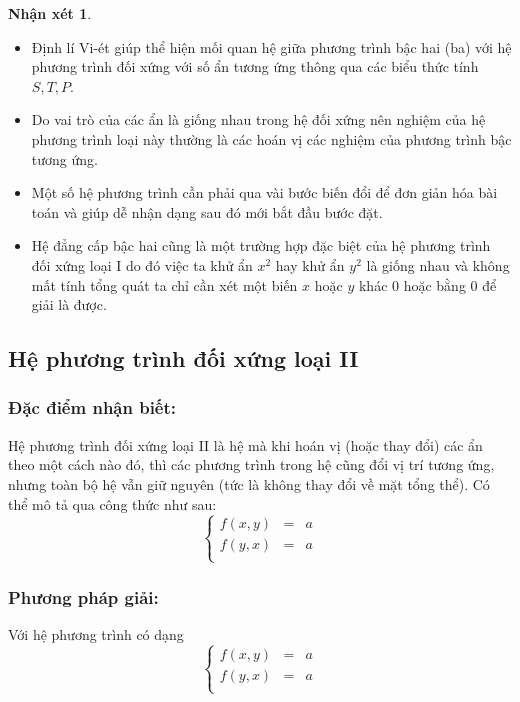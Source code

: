 \documentclass[12pt,a4paper,oneside]{book}
\theoremstyle{theorem}
\theoremstyle{definition}
\newtheorem{nx}[theorem2]{Nhận xét}
\begin{document}
\begin{nx}\begin{itemize}
      \item Định lí Vi-ét giúp thể hiện mối quan hệ giữa phương trình bậc hai (ba) với hệ phương trình đối xứng với số ẩn tương ứng thông qua các biểu thức tính $S,T,P$.
      \item Do vai trò của các ẩn là giống nhau trong hệ đối xứng nên nghiệm của hệ phương trình loại này thường là các hoán vị các nghiệm của phương trình bậc tương ứng.
      \item Một số hệ phương trình cần phải qua vài bước biến đổi để đơn giản hóa bài toán và giúp dễ nhận dạng sau đó mới bắt đầu bước đặt.
      \item Hệ đẳng cấp bậc hai cũng là một trường hợp đặc biệt của hệ phương trình đối xứng loại I do đó việc ta khử ẩn $x^2$ hay khử ẩn $y^2$ là giống nhau và không mất tính tổng quát ta chỉ cần xét một biến $x$ hoặc $y$ khác 0 hoặc bằng 0 để giải là được. 
    \end{itemize}
\end{nx}

\subsection{Hệ phương trình đối xứng loại II}
\subsubsection{Đặc điểm nhận biết:} Hệ phương trình đối xứng loại II là hệ mà khi hoán vị (hoặc thay đổi) các ẩn theo một cách nào đó, thì các phương trình trong hệ cũng đổi vị trí tương ứng, nhưng toàn bộ hệ vẫn giữ nguyên (tức là không thay đổi về mặt tổng thể). Có thể mô tả qua công thức như sau:
\[\left\{
\begin{array}{lcl}
\displaystyle f(x,y)&=&a \\[1.5ex]
\displaystyle f(y,x)&=&a\\
\end{array}
\right.\]
\subsubsection{Phương pháp giải:} Với hệ phương trình có dạng
\[\left\{
\begin{array}{lcl}
\displaystyle f(x,y)&=&a \\[1.5ex]
\displaystyle f(y,x)&=&a\\
\end{array}
\right.\]
\end{document}
